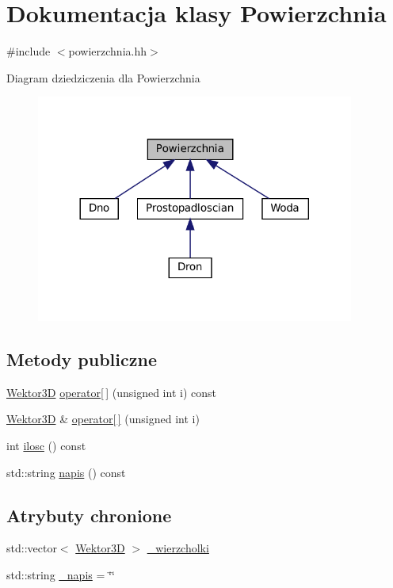 \hypertarget{class_powierzchnia}{}\section{Dokumentacja klasy Powierzchnia}
\label{class_powierzchnia}


{\ttfamily \#include $<$powierzchnia.\+hh$>$}



Diagram dziedziczenia dla Powierzchnia\nopagebreak
\begin{figure}[H]
\begin{center}
\leavevmode
\includegraphics[width=296pt]{class_powierzchnia__inherit__graph}
\end{center}
\end{figure}
\subsection*{Metody publiczne}
\begin{DoxyCompactItemize}
\item 
\mbox{\hyperlink{class_wektor3_d}{Wektor3D}} \mbox{\hyperlink{class_powierzchnia_ad6359705945ff2b275950f918d34a49e}{operator\mbox{[}$\,$\mbox{]}}} (unsigned int i) const
\item 
\mbox{\hyperlink{class_wektor3_d}{Wektor3D}} \& \mbox{\hyperlink{class_powierzchnia_a65630dfdb8e9601a04d186a74adff189}{operator\mbox{[}$\,$\mbox{]}}} (unsigned int i)
\item 
int \mbox{\hyperlink{class_powierzchnia_aaccea9358f37f18de45e0afddd84c93d}{ilosc}} () const
\item 
std\+::string \mbox{\hyperlink{class_powierzchnia_ab6ff9b19f96772931a2861fde2f14ade}{napis}} () const
\end{DoxyCompactItemize}
\subsection*{Atrybuty chronione}
\begin{DoxyCompactItemize}
\item 
std\+::vector$<$ \mbox{\hyperlink{class_wektor3_d}{Wektor3D}} $>$ \mbox{\hyperlink{class_powierzchnia_aab8cbab789010fa80e3b9c7d27669951}{\+\_\+wierzcholki}}
\item 
std\+::string \mbox{\hyperlink{class_powierzchnia_a6bedeffe3d73b7b54c4b1d33dc81b83a}{\+\_\+napis}} = \char`\"{}\char`\"{}
\end{DoxyCompactItemize}


